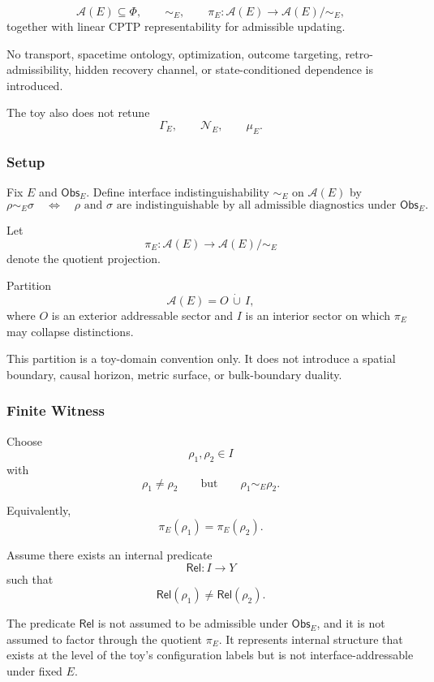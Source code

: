 \documentclass[aps,prx,onecolumn,11pt]{revtex4-2}
\theoremstyle{plain}
\theoremstyle{definition}
\theoremstyle{remark}
\begin{document}
\[
\mathcal A(E)\subseteq\Phi,
\qquad
\sim_E,
\qquad
\pi_E:\mathcal A(E)\to\mathcal A(E)/{\sim_E},
\]
together with linear CPTP representability for admissible updating.

No transport, spacetime ontology, optimization, outcome targeting,
retro-admissibility, hidden recovery channel, or state-conditioned
dependence is introduced.

The toy also does not retune
\[
\Gamma_E,
\qquad
\mathcal N_E,
\qquad
\mu_E.
\]

\subsubsection{Setup}
\label{toy:structure_wo_addressability_setup}

Fix \(E\) and \(\mathsf{Obs}_E\). Define interface indistinguishability
\(\sim_E\) on \(\mathcal A(E)\) by
\[
\rho\sim_E\sigma
\quad\Longleftrightarrow\quad
\rho
\text{ and }
\sigma
\text{ are indistinguishable by all admissible diagnostics under }
\mathsf{Obs}_E.
\]

Let
\[
\pi_E:\mathcal A(E)\to\mathcal A(E)/{\sim_E}
\]
denote the quotient projection.

Partition
\[
\mathcal A(E)=O\,\dot\cup\, I,
\]
where \(O\) is an exterior addressable sector and \(I\) is an interior
sector on which \(\pi_E\) may collapse distinctions.

This partition is a toy-domain convention only. It does not introduce a
spatial boundary, causal horizon, metric surface, or bulk-boundary
duality.

\subsubsection{Finite Witness}
\label{toy:structure_wo_addressability_witness}

Choose
\[
\rho_1,\rho_2\in I
\]
with
\[
\rho_1\neq\rho_2
\qquad
\text{but}
\qquad
\rho_1\sim_E\rho_2.
\]

Equivalently,
\[
\pi_E(\rho_1)=\pi_E(\rho_2).
\]

Assume there exists an internal predicate
\[
\mathsf{Rel}:I\to Y
\]
such that
\[
\mathsf{Rel}(\rho_1)\neq\mathsf{Rel}(\rho_2).
\]

The predicate \(\mathsf{Rel}\) is not assumed to be admissible under
\(\mathsf{Obs}_E\), and it is not assumed to factor through the quotient
\(\pi_E\). It represents internal structure that exists at the level of
the toy's configuration labels but is not interface-addressable under
fixed \(E\).
\end{document}

